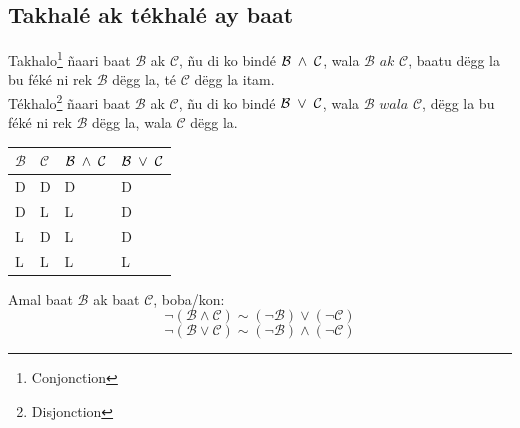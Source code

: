 \documentclass[twoside, a4paper]{article}
\begin{document}
\subsection{Takhalé ak tékhalé ay baat}
\begin{tcolorbox}[enhanced jigsaw,breakable,pad at break*=1mm, colback=red!5!white,colframe=white!75!black,title= Téeki\footnote{Définition},
  watermark color=white]
Takhalo\footnote{Conjonction} ñaari baat $\mathcal{B}$ ak $\mathcal{C}$, ñu di ko bindé $\mathcal{B}\hspace{0.1cm}\land\hspace{0.1cm}\mathcal{C}$, wala $\mathcal{B} \textit{ ak } \mathcal{C}$, baatu dëgg la bu féké ni rek $\mathcal{B}$ dëgg la, té $\mathcal{C}$ dëgg la itam.\\

Tékhalo\footnote{Disjonction} ñaari baat $\mathcal{B}$ ak $\mathcal{C}$, ñu di ko bindé $\mathcal{B}\hspace{0.1cm}\lor\hspace{0.1cm}\mathcal{C}$, wala $\mathcal{B} \textit{ wala } \mathcal{C}$, dëgg la bu féké ni rek $\mathcal{B}$ dëgg la, wala $\mathcal{C}$ dëgg la.\\

\begin{tabularx}{0.8\textwidth} { 
  | >{\centering\arraybackslash}X 
  | >{\centering\arraybackslash}X 
  | >{\centering\arraybackslash}X 
  | >{\centering\arraybackslash}X |}
 \hline
$\mathcal{B}$& $\mathcal{C}$ & $\mathcal{B}\hspace{0.1cm}\land\hspace{0.1cm}\mathcal{C}$ & $\mathcal{B}\hspace{0.1cm}\lor\hspace{0.1cm}\mathcal{C}$\\
 \hline
 D  & D & D & D \\
 D  & L & L & D \\
 L  & D & L & D\\
 L  & L & L & L\\
\hline
\end{tabularx}
\end{tcolorbox}


\begin{tcolorbox}[enhanced jigsaw,breakable,pad at break*=1mm, colback=blue!5!white,colframe=white!75!black,title= Tèg\footnote{Proposition},
  watermark color=white]
Amal baat $\mathcal{B}$ ak baat $\mathcal{C}$, boba/kon:
$$\neg(\mathcal{B} \land \mathcal{C}) \sim (\neg\mathcal{B}) \lor (\neg \mathcal{C})$$ 
$$\neg(\mathcal{B} \lor \mathcal{C})\sim (\neg\mathcal{B}) \land (\neg \mathcal{C})$$ 
\end{tcolorbox}
\end{document}

